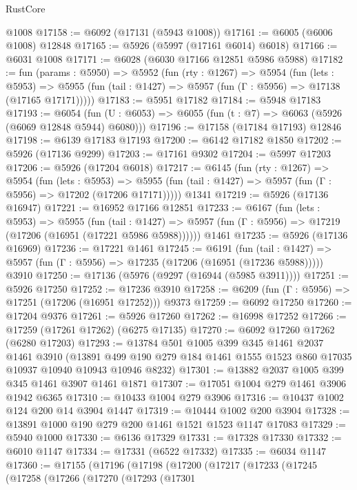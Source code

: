 \begin{lexlean}{RustCore}
\begin{coremodule}
    @1008
@17158 := @6092 (@17131 (@5943 @1008))
@17161 := @6005 (@6006 @1008) @12848
@17165 := @5926 (@5997 (@17161 @6014) @6018)
@17166 := @6031 @1008
@17171 := @6028 (@6030 @17166 @12851 @5986 @5988)
@17182 := fun (params : @5950) =>
  @5952
    (fun (rty : @1267) =>
    @5954
      (fun (lets : @5953) =>
      @5955 (fun (tail : @1427) => @5957 (fun (Γ : @5956) => @17138 (@17165 @17171)))))
@17183 := @5951 @17182
@17184 := @5948 @17183
@17193 := @6054
    (fun (U : @6053) => @6055 (fun (t : @7) => @6063 (@5926 (@6069 @12848 @5944) @6080)))
@17196 := @17158 (@17184 @17193) @12846
@17198 := @6139 @17183 @17193
@17200 := @6142 @17182 @1850
@17202 := @5926 (@17136 @9299)
@17203 := @17161 @9302
@17204 := @5997 @17203
@17206 := @5926 (@17204 @6018)
@17217 := @6145
    (fun (rty : @1267) =>
    @5954
      (fun (lets : @5953) =>
      @5955 (fun (tail : @1427) => @5957 (fun (Γ : @5956) => @17202 (@17206 @17171)))))
    @1341
@17219 := @5926 (@17136 @16947)
@17221 := @16952 @17166 @12851
@17233 := @6167
    (fun (lets : @5953) =>
    @5955
      (fun (tail : @1427) =>
      @5957 (fun (Γ : @5956) => @17219 (@17206 (@16951 (@17221 @5986 @5988))))))
    @1461
@17235 := @5926 (@17136 @16969)
@17236 := @17221 @1461
@17245 := @6191
    (fun (tail : @1427) => @5957 (fun (Γ : @5956) => @17235 (@17206 (@16951 (@17236 @5988)))))
    @3910
@17250 := @17136 (@5976 (@9297 (@16944 (@5985 @3911))))
@17251 := @5926 @17250
@17252 := @17236 @3910
@17258 := @6209 (fun (Γ : @5956) => @17251 (@17206 (@16951 @17252))) @9373
@17259 := @6092 @17250
@17260 := @17204 @9376
@17261 := @5926 @17260
@17262 := @16998 @17252
@17266 := @17259 (@17261 @17262) (@6275 @17135)
@17270 := @6092 @17260 @17262 (@6280 @17203)
@17293 := @13784
    @501
    @1005
    @399
    @345
    @1461
    @2037
    @1461
    @3910
    (@13891 @499 @190 @279 @184 @1461 @1555 @1523 @860 @17035 @10937 @10940 @10943 @10946 @8232)
@17301 := @13882 @2037 @1005 @399 @345 @1461 @3907 @1461 @1871
@17307 := @17051 @1004 @279 @1461 @3906 @1942 @6365
@17310 := @10433 @1004 @279 @3906
@17316 := @10437 @1002 @124 @200 @14 @3904 @1447
@17319 := @10444 @1002 @200 @3904
@17328 := @13891 @1000 @190 @279 @200 @1461 @1521 @1523 @1147 @17083
@17329 := @5940 @1000
@17330 := @6136 @17329
@17331 := @17328 @17330
@17332 := @6010 @1147
@17334 := @17331 (@6522 @17332)
@17335 := @6034 @1147
@17360 := @17155
    (@17196
      (@17198
        (@17200
          (@17217
            (@17233
              (@17245
                (@17258
                  (@17266
                    (@17270
                      (@17293
                        (@17301

\end{coremodule}
\end{lexlean}
